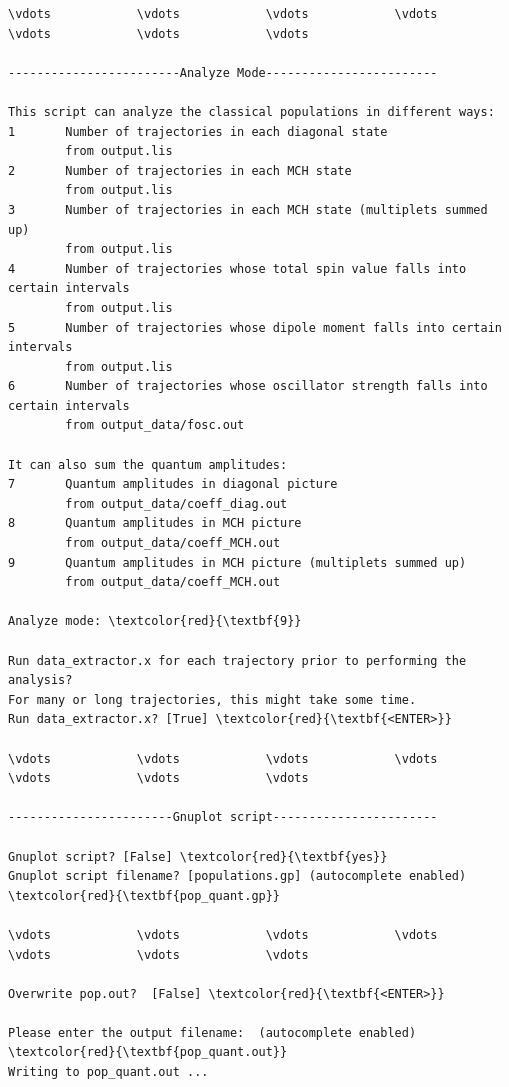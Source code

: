 \documentclass[a4paper,11pt,DIV=15,openany]{scrbook}
\begin{document}
\begin{oframed}
\footnotesize\begin{Verbatim}[commandchars=\\\{\}]
\vdots            \vdots            \vdots            \vdots            \vdots            \vdots            \vdots            

------------------------Analyze Mode------------------------

This script can analyze the classical populations in different ways:
1       Number of trajectories in each diagonal state                                   
        from output.lis
2       Number of trajectories in each MCH state                                        
        from output.lis
3       Number of trajectories in each MCH state (multiplets summed up)                 
        from output.lis
4       Number of trajectories whose total spin value falls into certain intervals      
        from output.lis
5       Number of trajectories whose dipole moment falls into certain intervals         
        from output.lis
6       Number of trajectories whose oscillator strength falls into certain intervals   
        from output_data/fosc.out

It can also sum the quantum amplitudes:
7       Quantum amplitudes in diagonal picture                                          
        from output_data/coeff_diag.out
8       Quantum amplitudes in MCH picture                                               
        from output_data/coeff_MCH.out
9       Quantum amplitudes in MCH picture (multiplets summed up)                        
        from output_data/coeff_MCH.out

Analyze mode: \textcolor{red}{\textbf{9}}

Run data_extractor.x for each trajectory prior to performing the analysis?
For many or long trajectories, this might take some time.
Run data_extractor.x? [True] \textcolor{red}{\textbf{<ENTER>}}

\vdots            \vdots            \vdots            \vdots            \vdots            \vdots            \vdots            

-----------------------Gnuplot script-----------------------

Gnuplot script? [False] \textcolor{red}{\textbf{yes}}
Gnuplot script filename? [populations.gp] (autocomplete enabled) \textcolor{red}{\textbf{pop_quant.gp}}

\vdots            \vdots            \vdots            \vdots            \vdots            \vdots            \vdots            

Overwrite pop.out?  [False] \textcolor{red}{\textbf{<ENTER>}}

Please enter the output filename:  (autocomplete enabled) \textcolor{red}{\textbf{pop_quant.out}}
Writing to pop_quant.out ...
\end{Verbatim}
\end{oframed}
\end{document}
